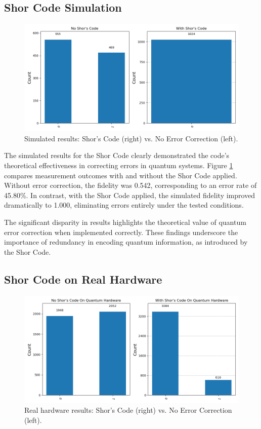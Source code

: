 \documentclass[10pt]{article}
\begin{document}
\begin{multicols}{2}
\subsection*{Shor Code Simulation}
\begin{figure}[H]
    \centering
    \includegraphics[width=1.0\columnwidth]{figures/shors_result_sim.png}
    \caption{Simulated results: Shor's Code (right) vs. No Error Correction (left).}
    \label{fig:shor_sim}
\end{figure}
The simulated results for the Shor Code clearly demonstrated the code's theoretical effectiveness in correcting errors in quantum systems. Figure \ref{fig:shor_sim} compares measurement outcomes with and without the Shor Code applied. Without error correction, the fidelity was 0.542, corresponding to an error rate of 45.80\%. In contrast, with the Shor Code applied, the simulated fidelity improved dramatically to 1.000, eliminating errors entirely under the tested conditions.

The significant disparity in results highlights the theoretical value of quantum error correction when implemented correctly. These findings underscore the importance of redundancy in encoding quantum information, as introduced by the Shor Code.

\subsection*{Shor Code on Real Hardware}
\begin{figure}[H]
    \centering
    \includegraphics[width=1.0\columnwidth]{figures/shors_results.png}
    \caption{Real hardware results: Shor's Code (right) vs. No Error Correction (left).}
    \label{fig:shor_real}
\end{figure}


\end{multicols}
\end{document}
